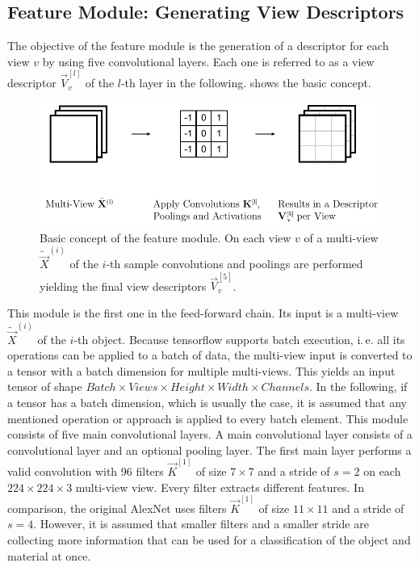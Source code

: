 \subsection{Feature Module: Generating View Descriptors}
\label{sec:architecture-feature-module}
The objective of the feature module is the generation of a descriptor for each view $v$ by using five convolutional layers.
Each one is referred to as a view descriptor $\vec{V}^{[l]}_v$ of the $l$-th layer in the following.
 shows the basic concept.
\begin{figure}
	\centering
	\includegraphics[]{images/feature_module.pdf}
	\caption{Basic concept of the feature module. On each view $v$ of a multi-view $\tilde{\vec{X}}^{(i)}$ of the $i$-th sample convolutions and poolings are performed yielding the final view descriptors $\vec{V}^{[5]}_v$.}
	\label{fig:feature-module}
\end{figure}
This module is the first one in the feed-forward chain.
Its input is a multi-view $\tilde{\vec{X}}^{(i)}$ of the $i$-th object.
Because tensorflow supports batch execution, i.\,e. all its operations can be applied to a batch of data, the multi-view input is converted to a tensor with a batch dimension for multiple multi-views.
This yields an input tensor of shape $Batch \times Views \times Height \times Width \times Channels$.
In the following, if a tensor has a batch dimension, which is usually the case, it is assumed that any mentioned operation or approach is applied to every batch element.
This module consists of five main convolutional layers.
A main convolutional layer consists of a convolutional layer and an optional pooling layer.
The first main layer performs a valid convolution with 96 filters $\vec{K}^{[1]}$ of size $7 \times 7$ and a stride of $s=2$ on each $224 \times 224 \times 3$ multi-view view.
Every filter extracts different features.
In comparison, the original AlexNet uses filters $\vec{K}^{[1]}$ of size $11 \times 11$ and a stride of $s=4$.
However, it is assumed that smaller filters and a smaller stride are collecting more information that can be used for a classification of the object and material at once.
